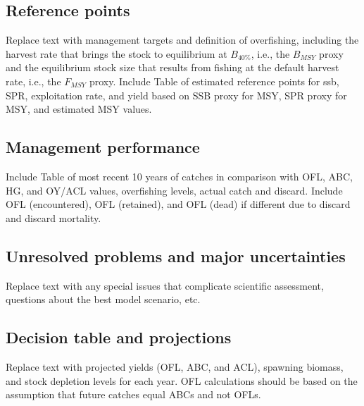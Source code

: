 \documentclass[11pt,
  english,
  letterpaper,
]{article}
\begin{document}
\hypertarget{reference-points}{%
\subsection*{Reference points}\label{reference-points}}

Replace text with management targets and definition of overfishing, including the harvest rate that brings the stock to equilibrium at \(B_{40\%}\), i.e., the \(B_{MSY}\) proxy and the equilibrium stock size that results from fishing at the default harvest rate, i.e., the \(F_{MSY}\) proxy. Include Table of estimated reference points for ssb, SPR, exploitation rate, and yield based on SSB proxy for MSY, SPR proxy for MSY, and estimated MSY values.

\hypertarget{management-performance}{%
\subsection*{Management performance}\label{management-performance}}

Include Table of most recent 10 years of catches in comparison with OFL, ABC, HG, and OY/ACL values, overfishing levels, actual catch and discard. Include OFL (encountered), OFL (retained), and OFL (dead) if different due to discard and discard mortality.

\hypertarget{unresolved-problems-and-major-uncertainties}{%
\subsection*{Unresolved problems and major uncertainties}\label{unresolved-problems-and-major-uncertainties}}

Replace text with any special issues that complicate scientific assessment, questions about the best model scenario, etc.

\hypertarget{decision-table-and-projections}{%
\subsection*{Decision table and projections}\label{decision-table-and-projections}}

Replace text with projected yields (OFL, ABC, and ACL), spawning biomass, and stock depletion levels for each year. OFL calculations should be based on the assumption that future catches equal ABCs and not OFLs.
\end{document}
